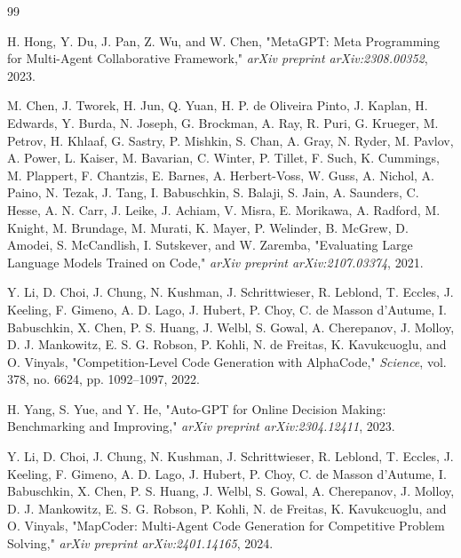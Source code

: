 \cleardoublepage
\renewcommand\bibname{References}

\begin{thebibliography}{99}


H. Hong, Y. Du, J. Pan, Z. Wu, and W. Chen, "MetaGPT: Meta Programming for Multi-Agent Collaborative Framework,"
\textit{arXiv preprint arXiv:2308.00352}, 2023.

M. Chen, J. Tworek, H. Jun, Q. Yuan, H. P. de Oliveira Pinto, J. Kaplan, H. Edwards, Y. Burda, N. Joseph, G. Brockman, A. Ray, R. Puri, G. Krueger, M. Petrov, H. Khlaaf, G. Sastry, P. Mishkin, S. Chan, A. Gray, N. Ryder, M. Pavlov, A. Power, L. Kaiser, M. Bavarian, C. Winter, P. Tillet, F. Such, K. Cummings, M. Plappert, F. Chantzis, E. Barnes, A. Herbert-Voss, W. Guss, A. Nichol, A. Paino, N. Tezak, J. Tang, I. Babuschkin, S. Balaji, S. Jain, A. Saunders, C. Hesse, A. N. Carr, J. Leike, J. Achiam, V. Misra, E. Morikawa, A. Radford, M. Knight, M. Brundage, M. Murati, K. Mayer, P. Welinder, B. McGrew, D. Amodei, S. McCandlish, I. Sutskever, and W. Zaremba, "Evaluating Large Language Models Trained on Code,"
\textit{arXiv preprint arXiv:2107.03374}, 2021.

Y. Li, D. Choi, J. Chung, N. Kushman, J. Schrittwieser, R. Leblond, T. Eccles, J. Keeling, F. Gimeno, A. D. Lago, J. Hubert, P. Choy, C. de Masson d'Autume, I. Babuschkin, X. Chen, P. S. Huang, J. Welbl, S. Gowal, A. Cherepanov, J. Molloy, D. J. Mankowitz, E. S. G. Robson, P. Kohli, N. de Freitas, K. Kavukcuoglu, and O. Vinyals, "Competition-Level Code Generation with AlphaCode,"
\textit{Science}, vol. 378, no. 6624, pp. 1092--1097, 2022.

H. Yang, S. Yue, and Y. He, "Auto-GPT for Online Decision Making: Benchmarking and Improving,"
\textit{arXiv preprint arXiv:2304.12411}, 2023.

Y. Li, D. Choi, J. Chung, N. Kushman, J. Schrittwieser, R. Leblond, T. Eccles, J. Keeling, F. Gimeno, A. D. Lago, J. Hubert, P. Choy, C. de Masson d'Autume, I. Babuschkin, X. Chen, P. S. Huang, J. Welbl, S. Gowal, A. Cherepanov, J. Molloy, D. J. Mankowitz, E. S. G. Robson, P. Kohli, N. de Freitas, K. Kavukcuoglu, and O. Vinyals, "MapCoder: Multi-Agent Code Generation for Competitive Problem Solving,"
\textit{arXiv preprint arXiv:2401.14165}, 2024.


\end{thebibliography}
